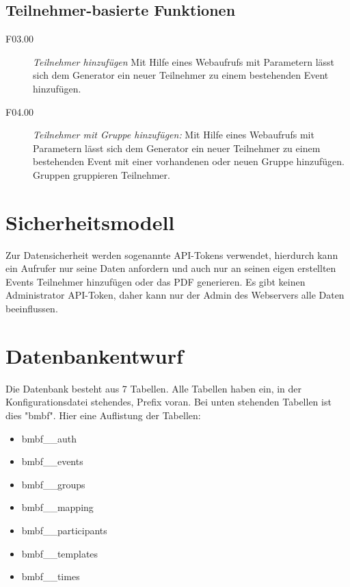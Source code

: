 \documentclass[12pt,parskip=full, pagea4]{scrreprt}
\begin{document}
			\section{Teilnehmer-basierte Funktionen}
			
			\begin{description}
				\item[F03.00]
				\textit{Teilnehmer hinzuf\"ugen} 
				Mit Hilfe eines Webaufrufs mit Parametern lässt sich dem Generator ein neuer Teilnehmer zu einem bestehenden Event hinzufügen.
				\item[F04.00]
				\textit{Teilnehmer mit Gruppe hinzuf\"ugen:} 
				Mit Hilfe eines Webaufrufs mit Parametern lässt sich dem Generator ein neuer Teilnehmer zu einem bestehenden Event mit einer vorhandenen oder neuen Gruppe hinzufügen. Gruppen gruppieren Teilnehmer.
			\end{description}
		
		\chapter{Sicherheitsmodell}
		
			Zur Datensicherheit werden sogenannte API-Tokens verwendet, hierdurch kann ein Aufrufer nur seine Daten anfordern und auch nur an seinen eigen erstellten Events Teilnehmer hinzufügen oder das PDF generieren. Es gibt keinen Administrator API-Token, daher kann nur der Admin des Webservers alle Daten beeinflussen.
			
		\chapter{Datenbankentwurf}
		
			Die Datenbank besteht aus 7 Tabellen. Alle Tabellen haben ein, in der Konfigurationsdatei stehendes, Prefix voran. Bei unten stehenden Tabellen ist dies "bmbf". Hier eine Auflistung der Tabellen:
			
			\begin{itemize}
				\item bmbf\_\_auth
				\item bmbf\_\_events
				\item bmbf\_\_groups
				\item bmbf\_\_mapping
				\item bmbf\_\_participants
				\item bmbf\_\_templates
				\item bmbf\_\_times
			\end{itemize}
		
\end{document}
